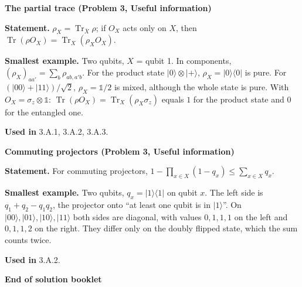 \documentclass[11pt,a4paper]{article}
\newcommand{\ket}[1]{\lvert #1\rangle}
\newcommand{\bra}[1]{\langle #1\rvert}
\newcommand{\Tr}{\operatorname{Tr}}
\newcommand{\smallheading}[1]{\par\Needspace{6\baselineskip}\medskip\textbf{#1}\par}
\newcommand{\id}{\mathds 1}
\begin{document}
\smallheading{The partial trace (Problem 3, Useful information)}
\textbf{Statement.} $\rho_X=\Tr_{\bar X}\rho$; if $O_X$ acts only on $X$, then $\Tr(\rho O_X)=\Tr_X(\rho_XO_X)$.\par
\textbf{Smallest example.} Two qubits, $X$ = qubit 1. In components, $(\rho_X)_{aa'}=\sum_b\rho_{ab,a'b}$. For the product state $\ket0\otimes\ket+$, $\rho_X=\ket0\bra0$ is pure. For $(\ket{00}+\ket{11})/\sqrt2$, $\rho_X=\id/2$ is mixed, although the whole state is pure. With $O_X=\sigma_z\otimes\id$: $\Tr(\rho O_X)=\Tr_X(\rho_X\sigma_z)$ equals $1$ for the product state and $0$ for the entangled one.\par
\textbf{Used in} 3.A.1, 3.A.2, 3.A.3.

\smallheading{Commuting projectors (Problem 3, Useful information)}
\textbf{Statement.} For commuting projectors, $1-\prod_{x\in X}(1-q_x)\leq\sum_{x\in X}q_x$.\par
\textbf{Smallest example.} Two qubits, $q_x=\ket1\bra1$ on qubit $x$. The left side is $q_1+q_2-q_1q_2$, the projector onto ``at least one qubit is in $\ket1$''. On $\ket{00},\ket{01},\ket{10},\ket{11}$ both sides are diagonal, with values $0,1,1,1$ on the left and $0,1,1,2$ on the right. They differ only on the doubly flipped state, which the sum counts twice.\par
\textbf{Used in} 3.A.2.
\vfill
\begin{center}\textbf{End of solution booklet}\end{center}
\end{document}
